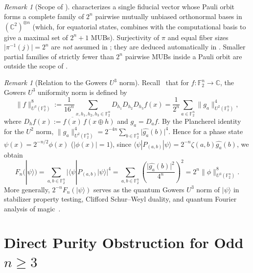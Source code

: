\documentclass[11pt,a4paper]{article}
\theoremstyle{plain}
\theoremstyle{definition}
\theoremstyle{remark}
\newtheorem{remark}[lemma]{Remark}
\newcommand{\C}{\mathbb{C}}
\newcommand{\F}{\mathbb{F}}
\newcommand{\ket}[1]{|#1\rangle}
\newcommand{\expval}[2]{\langle#1|#2|#1\rangle}
\newcommand{\abs}[1]{\lvert#1\rvert}
\newcommand{\norm}[1]{\lVert#1\rVert}
\numberwithin{equation}{section}
\begin{document}
\begin{remark}[Scope of ]\label{rem:mub-scope}
 characterizes a single fiducial vector whose Pauli orbit forms a complete family of $2^n$ pairwise mutually unbiased orthonormal bases in $(\C^2)^{\otimes n}$ (which, for equatorial states, combines with the computational basis to give a maximal set of $2^n + 1$ MUBs). Surjectivity of $\pi$ and equal fiber sizes $\abs{\pi^{-1}(j)} = 2^n$ are \emph{not} assumed in ; they are deduced automatically in . Smaller partial families of strictly fewer than $2^n$ pairwise MUBs inside a Pauli orbit are outside the scope of .
\end{remark}

\begin{remark}[Relation to the Gowers $U^3$ norm]\label{rem:gowers-u3}
Recall~\cite{gowers2001new} that for $f : \F_2^n \to \C$, the Gowers $U^3$ uniformity norm is defined by
\[
  \norm{f}_{U^3(\F_2^n)}^8 := \frac{1}{16^n} \sum_{x, h_1, h_2, h_3 \in \F_2^n} D_{h_1} D_{h_2} D_{h_3} f(x)
  = \frac{1}{2^n} \sum_{a \in \F_2^n} \norm{g_a}_{U^2(\F_2^n)}^4,
\]
where $D_h f(x) := \overline{f(x)}\, f(x \oplus h)$ and $g_a = D_a f$. By the Plancherel identity for the $U^2$ norm, $\norm{g_a}_{U^2(\F_2^n)}^4 = 2^{-4n} \sum_{b \in \F_2^n} \abs{\widehat{g_a}(b)}^4$. Hence for a phase state $\psi(x) = 2^{-n/2}\phi(x)$ ($\abs{\phi(x)} = 1$), since $\expval{\psi}{P_{(a,b)}} = 2^{-n}\zeta(a,b)\widehat{g_a}(b)$, we obtain
\begin{equation}\label{eq:Fn-U3}
  F_n(\ket{\psi}) = \sum_{a, b \in \F_2^n} \abs{\expval{\psi}{P_{(a,b)}}}^4 = \sum_{a, b \in \F_2^n} \left(\frac{\abs{\widehat{g_a}(b)}^2}{4^n}\right)^2 = 2^n \norm{\phi}_{U^3(\F_2^n)}^8.
\end{equation}
More generally, $2^{-n} F_n(\ket{\psi})$ serves as the quantum Gowers $U^3$ norm of $\ket{\psi}$ in stabilizer property testing, Clifford Schur--Weyl duality, and quantum Fourier analysis of magic~\cite{gross2021schur,bu2025stabilizer,arunachalam2025polynomial}.
\end{remark}

\section{Direct Purity Obstruction for Odd \texorpdfstring{$n \ge 3$}{n >= 3}}\label{sec:odd-purity}
\end{document}
